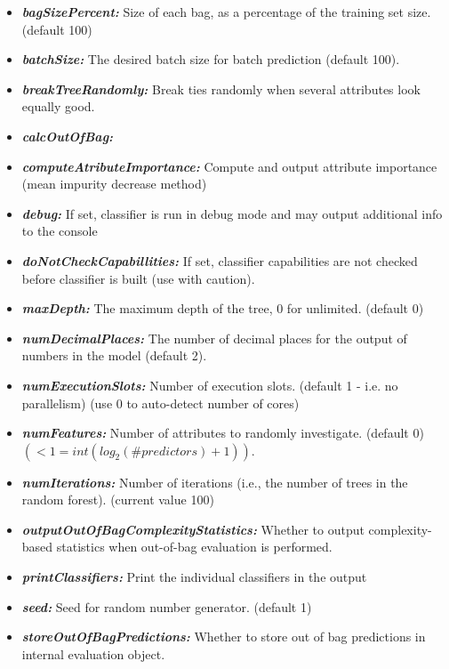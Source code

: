 \documentclass[12pt]{article}
\begin{document}
\begin{itemize}
	\item \textbf{\textit{bagSizePercent:}}
	      Size of each bag, as a percentage of the training set size. (default 100)
	\item \textbf{\textit{batchSize:}}
	      The desired batch size for batch prediction  (default 100).
	\item \textbf{\textit{breakTreeRandomly:}}
	      Break ties randomly when several attributes look equally good.
	\item \textbf{\textit{calcOutOfBag:}}
	\item \textbf{\textit{computeAtributeImportance:}}
	      Compute and output attribute importance (mean impurity decrease method)
	\item \textbf{\textit{debug:}}
	      If set, classifier is run in debug mode and may output additional info to the console
	\item \textbf{\textit{doNotCheckCapabillities:}}
	      If set, classifier capabilities are not checked before classifier is built
	      (use with caution).
	\item \textbf{\textit{maxDepth:}}
	      The maximum depth of the tree, 0 for unlimited.
	      (default 0)
	\item \textbf{\textit{numDecimalPlaces:}}
	      The number of decimal places for the output of numbers in the model (default 2).
	\item \textbf{\textit{numExecutionSlots:}}
	      Number of execution slots.
	      (default 1 - i.e. no parallelism)
	      (use 0 to auto-detect number of cores)
	\item \textbf{\textit{numFeatures:}}
	      Number of attributes to randomly investigate. (default 0)\\
	      $(<1 = int(log_2(\#predictors)+1))$.
	\item \textbf{\textit{numIterations:}}
	      Number of iterations (i.e., the number of trees in the random forest). (current value 100)
	\item \textbf{\textit{outputOutOfBagComplexityStatistics:}}
	      Whether to output complexity-based statistics when out-of-bag evaluation is performed.
	\item \textbf{\textit{printClassifiers:}}
	      Print the individual classifiers in the output
	\item \textbf{\textit{seed:}}
	      Seed for random number generator.
	      (default 1)
	\item \textbf{\textit{storeOutOfBagPredictions:}}
	      Whether to store out of bag predictions in internal evaluation object.
\end{itemize}
\end{document}
